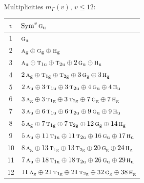 \documentclass[11pt]{article}
\newcommand{\irr}[1]{\text{\normalfont\scshape #1}}
\newcommand{\ptag}[1]{\mathrm{#1}}
\begin{document}
Multiplicities $m_\Gamma(v)$, $v\le12$:
\begin{longtable}{c l}\hline $v$ & $\operatorname{Sym}^{v}\irr{g}_{\ptag{u}}$\\ \hline\endhead
1 & $\irr{g}_{\ptag{u}}$\\
2 & $\irr{a}_{\ptag{g}}\oplus \irr{g}_{\ptag{g}}\oplus \irr{h}_{\ptag{g}}$\\
3 & $\irr{a}_{\ptag{u}}\oplus \irr{t}_{1\ptag{u}}\oplus \irr{t}_{2\ptag{u}}\oplus 2\,\irr{g}_{\ptag{u}}\oplus \irr{h}_{\ptag{u}}$\\
4 & $2\,\irr{a}_{\ptag{g}}\oplus \irr{t}_{1\ptag{g}}\oplus \irr{t}_{2\ptag{g}}\oplus 3\,\irr{g}_{\ptag{g}}\oplus 3\,\irr{h}_{\ptag{g}}$\\
5 & $2\,\irr{a}_{\ptag{u}}\oplus 3\,\irr{t}_{1\ptag{u}}\oplus 3\,\irr{t}_{2\ptag{u}}\oplus 4\,\irr{g}_{\ptag{u}}\oplus 4\,\irr{h}_{\ptag{u}}$\\
6 & $3\,\irr{a}_{\ptag{g}}\oplus 3\,\irr{t}_{1\ptag{g}}\oplus 3\,\irr{t}_{2\ptag{g}}\oplus 7\,\irr{g}_{\ptag{g}}\oplus 7\,\irr{h}_{\ptag{g}}$\\
7 & $3\,\irr{a}_{\ptag{u}}\oplus 6\,\irr{t}_{1\ptag{u}}\oplus 6\,\irr{t}_{2\ptag{u}}\oplus 9\,\irr{g}_{\ptag{u}}\oplus 9\,\irr{h}_{\ptag{u}}$\\
8 & $5\,\irr{a}_{\ptag{g}}\oplus 7\,\irr{t}_{1\ptag{g}}\oplus 7\,\irr{t}_{2\ptag{g}}\oplus 12\,\irr{g}_{\ptag{g}}\oplus 14\,\irr{h}_{\ptag{g}}$\\
9 & $5\,\irr{a}_{\ptag{u}}\oplus 11\,\irr{t}_{1\ptag{u}}\oplus 11\,\irr{t}_{2\ptag{u}}\oplus 16\,\irr{g}_{\ptag{u}}\oplus 17\,\irr{h}_{\ptag{u}}$\\
10 & $8\,\irr{a}_{\ptag{g}}\oplus 13\,\irr{t}_{1\ptag{g}}\oplus 13\,\irr{t}_{2\ptag{g}}\oplus 20\,\irr{g}_{\ptag{g}}\oplus 24\,\irr{h}_{\ptag{g}}$\\
11 & $7\,\irr{a}_{\ptag{u}}\oplus 18\,\irr{t}_{1\ptag{u}}\oplus 18\,\irr{t}_{2\ptag{u}}\oplus 26\,\irr{g}_{\ptag{u}}\oplus 29\,\irr{h}_{\ptag{u}}$\\
12 & $11\,\irr{a}_{\ptag{g}}\oplus 21\,\irr{t}_{1\ptag{g}}\oplus 21\,\irr{t}_{2\ptag{g}}\oplus 32\,\irr{g}_{\ptag{g}}\oplus 38\,\irr{h}_{\ptag{g}}$\\
\hline\end{longtable}
\end{document}
